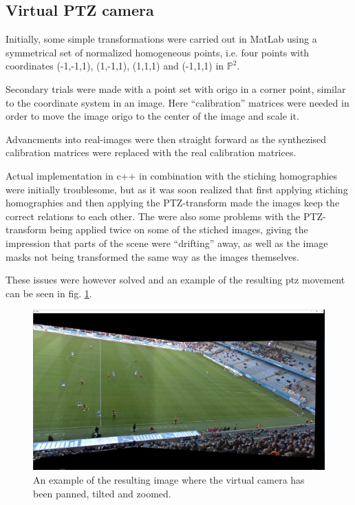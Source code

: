 \subsection{Virtual PTZ camera}
Initially, some simple transformations were carried out in MatLab using a symmetrical set of normalized homogeneous points, i.e. four points with coordinates (-1,-1,1), (1,-1,1), (1,1,1) and (-1,1,1) in $\mathbb{P}^2$. 

Secondary trials were made with a point set with origo in a corner point, similar to the coordinate system in an image. Here ``calibration'' matrices were needed in order to move the image origo to the center of the image and scale it. 

Advancments into real-images were then straight forward as the synthezised calibration matrices were replaced with the real calibration matrices. 

Actual implementation in c++ in combination with the stiching homographies were initially troublesome, but as it was soon realized that first applying stiching homographies and then applying the PTZ-transform made the images keep the correct relations to each other. The were also some problems with the PTZ-transform being applied twice on some of the stiched images, giving the impression that parts of the scene were ``drifting'' away, as well as the image masks not being transformed the same way as the images themselves.

These issues were however solved and an example of the resulting ptz movement can be seen in fig. \ref{fig:ptz_res}.

\begin{figure}[H]
	\centering
	\includegraphics[width=0.8\columnwidth]{../results/images/PTZ_res.PNG}
	\caption{An example of the resulting image where the virtual camera has been panned, tilted and zoomed.}
	\label{fig:ptz_res}
\end{figure}
